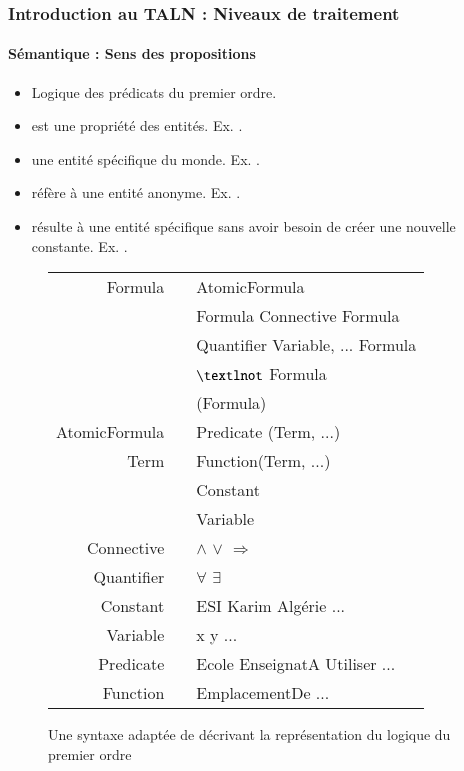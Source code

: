 \documentclass[xcolor=table]{beamer}
\begin{document}
\begin{frame}
\frametitle{Introduction au TALN : Niveaux de traitement}
\framesubtitle{Sémantique : Sens des propositions}

\begin{minipage}{0.5\textwidth}
\begin{itemize}
	\item Logique des prédicats du premier ordre.
	\item {} est une propriété des entités. 
	Ex. .	
	\item {} une entité spécifique du monde. 
	Ex. .
	\item {} réfère à une entité anonyme. 
	Ex. .
	\item {} résulte à une entité spécifique sans avoir besoin de créer une nouvelle constante. 
	Ex. .
\end{itemize}
\end{minipage}
\begin{minipage}{0.48\textwidth}
	\begin{figure}
		\tiny\bfseries
		\begin{tabular}{rcl}
			\hline\hline
			Formula & \textrightarrow & AtomicFormula \\
			& \textbar        & Formula Connective Formula \\
			& \textbar        & Quantifier Variable, ... Formula \\
			& \textbar        & $\textlnot$ Formula \\
			& \textbar        & (Formula) \\
			AtomicFormula & \textrightarrow & Predicate (Term, ...) \\
			Term    & \textrightarrow & Function(Term, ...) \\
			& \textbar        & Constant \\
			& \textbar        & Variable \\
			Connective & \textrightarrow & $\wedge$ \textbar $\vee$ \textbar $\Rightarrow$ \\
			Quantifier & \textrightarrow & $\forall$ \textbar $\exists$ \\
			Constant & \textrightarrow & ESI \textbar Karim \textbar Algérie ...\\
			Variable & \textrightarrow & x \textbar y \textbar ... \\
			Predicate & \textrightarrow & Ecole \textbar EnseignatA \textbar Utiliser \textbar ... \\
			Function & \textrightarrow & EmplacementDe \textbar ... \\
			\hline\hline
		\end{tabular}
		\caption{Une syntaxe adaptée de \cite{2002-russell-norvig} décrivant la représentation du logique du premier ordre \cite{2019-jurafsky-martin}}
	\end{figure}
\end{minipage}

\end{frame}
\end{document}
